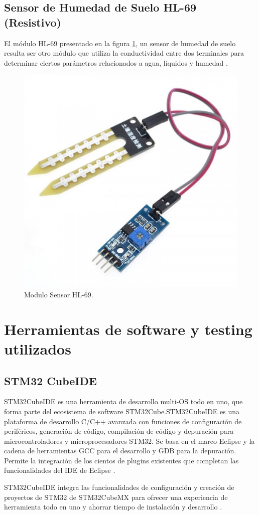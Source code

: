 \subsection{Sensor de Humedad de Suelo HL-69 (Resistivo)}
El módulo HL-69 presentado en la figura \ref{fig:SensorHL-69}, un sensor de humedad de suelo resulta ser otro módulo que utiliza la conductividad entre dos terminales para determinar ciertos parámetros relacionados a agua, líquidos y humedad \citep{ModuloHL-69}.
\begin{figure}[htbp]
	\centering
	\includegraphics[width=.4\textwidth]{./Figures/sensordehumedad.jpg}
	\caption{Modulo Sensor HL-69.}
	\label{fig:SensorHL-69}
\end{figure}

\section{Herramientas de software y testing utilizados}
\subsection{STM32 CubeIDE}
STM32CubeIDE es una herramienta de desarrollo multi-OS todo en uno, que forma parte del ecosistema de software STM32Cube.STM32CubeIDE es una plataforma de desarrollo C/C++ avanzada con funciones de configuración de periféricos, generación de código, compilación de código y depuración para microcontroladores y microprocesadores STM32. Se basa en el marco Eclipse  y la cadena de herramientas GCC para el desarrollo y GDB para la depuración. Permite la integración de los cientos de plugins existentes que completan las funcionalidades del IDE de Eclipse \citep{STM32CUBEIDE}.

STM32CubeIDE integra las funcionalidades de configuración y creación de proyectos de STM32 de STM32CubeMX para ofrecer una experiencia de herramienta todo en uno y ahorrar tiempo de instalación y desarrollo \citep{STM32CUBEIDE}.

